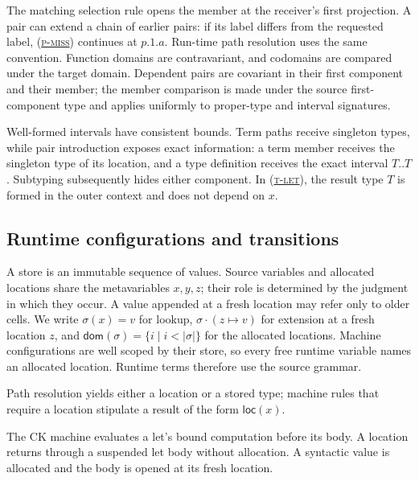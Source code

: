 \documentclass[acmsmall,screen,nonacm]{acmart}
\newcommand{\ruleref}[1]{%
  \textsc{(\hyperref[rule:#1]{#1})}}
\newcommand{\loc}[1]{\mathsf{loc}(#1)}
\newcommand{\rulesetup}{%
  \small
  \smallrulenames
  \setlength{\afterruleskip}{2em plus 0.2em minus 0.1em}%
  \setlength{\labelminsep}{0.6em}%
  \renewcommand{\arraystretch}{1.15}%
  \renewcommand{\andalso}{\qquad}%
}
\begin{document}
The matching selection rule opens the member at the receiver's first
projection. A pair can extend a chain of earlier pairs: if its label differs
from the requested label, \ruleref{p-miss} continues at \(p.1.a\). Run-time
path resolution uses the same convention. Function domains are contravariant,
and codomains are compared under the target domain. Dependent pairs are
covariant in their first component and their member; the member comparison
is made under the source first-component type and applies uniformly to
proper-type and interval signatures.

Well-formed intervals have consistent bounds. Term paths receive singleton
types, while pair introduction exposes exact information: a term member
receives the singleton type of its location, and a type definition receives
the exact interval \(T..T\). Subtyping subsequently hides either component. In
\ruleref{t-let}, the result type \(T\) is formed in the outer context and does
not depend on \(x\).

\subsection{Runtime configurations and transitions}
\label{sec:machine}

A store is an immutable sequence of values. Source variables and allocated
locations share the metavariables \(x,y,z\); their role is determined by the
judgment in which they occur. A value appended at a fresh location may refer
only to older cells. We write \(\sigma(x)=v\) for lookup,
\(\sigma\mathbin{\cdot}(z\mapsto v)\) for extension at a fresh location
\(z\), and
\(\mathsf{dom}(\sigma)=\{i\mid i<|\sigma|\}\) for the allocated locations.
Machine configurations are well scoped by their store, so every free runtime
variable names an allocated location. Runtime terms therefore use the source
grammar.

Path resolution yields either a location or a stored type; machine rules that
require a location stipulate a result of the form \(\loc{x}\).

The CK machine evaluates a let's bound computation before its body. A location
returns through a suspended let body without allocation. A syntactic value is
allocated and the body is opened at its fresh location.

\clearpage
\begingroup
\setlength{\abovedisplayskip}{5pt plus 1pt minus 1pt}
\setlength{\belowdisplayskip}{5pt plus 1pt minus 1pt}
\setlength{\intextsep}{4pt}
\captionsetup{skip=6pt}
\rulesetup
\end{document}
